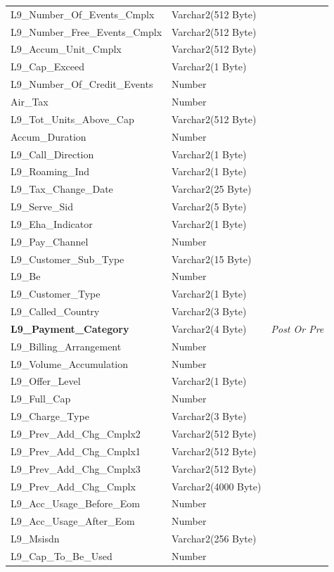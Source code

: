 \documentclass[12pt,twoside]{article}
\begin{document}
\begin{longtable}{l|l|l}
L9\_Number\_Of\_Events\_Cmplx & Varchar2(512 Byte) & \\
L9\_Number\_Free\_Events\_Cmplx & Varchar2(512 Byte) & \\
L9\_Accum\_Unit\_Cmplx & Varchar2(512 Byte) & \\
L9\_Cap\_Exceed & Varchar2(1 Byte) & \\
L9\_Number\_Of\_Credit\_Events & Number & \\
Air\_Tax & Number & \\
L9\_Tot\_Units\_Above\_Cap & Varchar2(512 Byte) & \\
Accum\_Duration & Number & \\
L9\_Call\_Direction & Varchar2(1 Byte) & \\
L9\_Roaming\_Ind & Varchar2(1 Byte) & \\
L9\_Tax\_Change\_Date & Varchar2(25 Byte) & \\
L9\_Serve\_Sid & Varchar2(5 Byte) & \\
L9\_Eha\_Indicator & Varchar2(1 Byte) & \\
L9\_Pay\_Channel & Number & \\
L9\_Customer\_Sub\_Type & Varchar2(15 Byte) & \\
L9\_Be & Number & \\
L9\_Customer\_Type & Varchar2(1 Byte) & \\
L9\_Called\_Country & Varchar2(3 Byte) & \\
\textbf{L9\_Payment\_Category} & Varchar2(4 Byte) & \emph{Post Or Pre}\\
L9\_Billing\_Arrangement & Number & \\
L9\_Volume\_Accumulation & Number & \\
L9\_Offer\_Level & Varchar2(1 Byte) & \\
L9\_Full\_Cap & Number & \\
L9\_Charge\_Type & Varchar2(3 Byte) & \\
L9\_Prev\_Add\_Chg\_Cmplx2 & Varchar2(512 Byte) & \\
L9\_Prev\_Add\_Chg\_Cmplx1 & Varchar2(512 Byte) & \\
L9\_Prev\_Add\_Chg\_Cmplx3 & Varchar2(512 Byte) & \\
L9\_Prev\_Add\_Chg\_Cmplx & Varchar2(4000 Byte) & \\
L9\_Acc\_Usage\_Before\_Eom & Number & \\
L9\_Acc\_Usage\_After\_Eom & Number & \\
L9\_Msisdn & Varchar2(256 Byte) & \\
L9\_Cap\_To\_Be\_Used & Number & \\

\end{longtable}
\end{document}
